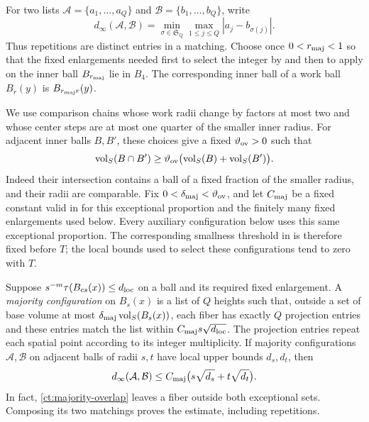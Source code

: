 For two lists $\mathcal A=\{a_1,\ldots,a_Q\}$ and
$\mathcal B=\{b_1,\ldots,b_Q\}$, write
\[
 d_\infty(\mathcal A,\mathcal B)
 =\min_{\sigma\in\mathfrak S_Q}\max_{1\le j\le Q}|a_j-b_{\sigma(j)}|.
\]
Thus repetitions are distinct entries in a matching. Choose once
$0<r_{\rm maj}<1$ so that the fixed enlargements needed first to select
the integer by  and then to apply  on
the inner ball $B_{r_{\rm maj}}$ lie in $B_4$.
The corresponding inner ball of a work ball $B_r(y)$ is
$B_{r_{\rm maj}r}(y)$.

We use comparison chains whose work radii change by factors at most two
and whose center steps are at most one quarter of the smaller inner
radius. For adjacent inner balls $B,B'$, these choices give a fixed
$\vartheta_{\rm ov}>0$ such that
\begin{equation}\label{ct:majority-overlap}
 \operatorname{vol}_S(B\cap B')\ge
 \vartheta_{\rm ov}\bigl(\operatorname{vol}_S(B)+\operatorname{vol}_S(B')\bigr).
\end{equation}
Indeed their intersection contains a ball of a fixed fraction of the
smaller radius, and their radii are comparable. Fix
$0<\delta_{\rm maj}<\vartheta_{\rm ov}$, and let $C_{\rm maj}$ be a fixed
constant valid in  for this exceptional proportion and
the finitely many fixed enlargements used below. Every auxiliary
configuration below uses this same exceptional proportion. The corresponding
smallness threshold in  is therefore fixed before $T$;
the local bounds used to select these configurations tend to zero with $T$.

Suppose $s^{-m}\tau(B_{cs}(x))\le d_{\rm loc}$ on a ball and its required
fixed enlargement. A \emph{majority configuration} on $B_s(x)$ is a list
of $Q$ heights such that, outside a set of base volume at most
$\delta_{\rm maj}\operatorname{vol}_S(B_s(x))$, each fiber has exactly $Q$ projection
entries and these entries match the list within
$C_{\rm maj}s\sqrt{d_{\rm loc}}$. The projection entries repeat each
spatial point according to its integer multiplicity. If majority
configurations $\mathcal A,\mathcal B$ on adjacent balls of radii $s,t$
have local upper bounds $d_s,d_t$, then
\begin{equation}\label{ct:majority-matching}
 d_\infty(\mathcal A,\mathcal B)
 \le C_{\rm maj}\bigl(s\sqrt{d_s}+t\sqrt{d_t}\bigr).
\end{equation}
In fact, \eqref{ct:majority-overlap} leaves a fiber outside both
exceptional sets. Composing its two matchings proves the estimate,
including repetitions.

